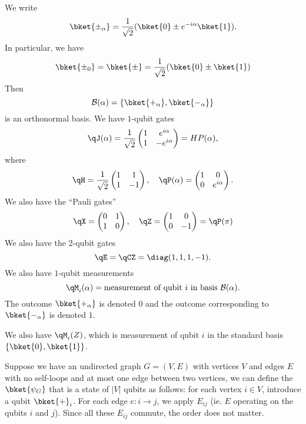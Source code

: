 \documentclass[a4paper]{article}
\begin{document}
\begin{notation}\index{$\bket{\pm_\alpha}$}
  We write
  \[
    \bket{\pm_\alpha} = \frac{1}{\sqrt{2}} (\bket{0} \pm e^{-i\alpha} \bket{1}).
  \]
  In particular, we have
  \[
    \bket{\pm_0} = \bket{\pm} = \frac{1}{\sqrt{2}}(\bket{0} \pm \bket{1})
  \]
  Then
  \[
    \mathcal{B}(\alpha) = \{\bket{+_\alpha}, \bket{-_\alpha}\}
  \]
  is an orthonormal basis. We have $1$-qubit gates
  \[
    \qJ(\alpha) = \frac{1}{\sqrt{2}}
    \begin{pmatrix}
      1 & e^{i\alpha}\\
      1 & -e^{i\alpha}
    \end{pmatrix} = H P(\alpha),
  \]
  where
  \[
    \qH = \frac{1}{\sqrt{2}}
    \begin{pmatrix}
      1 & 1\\
      1 & -1
    \end{pmatrix},\quad \qP(\alpha) =
    \begin{pmatrix}
      1 & 0\\
      0 & e^{i\alpha}
    \end{pmatrix}.
  \]
  We also have the ``Pauli gates''
  \[
    \qX=
    \begin{pmatrix}
      0 & 1\\
      1 & 0
    \end{pmatrix},\quad
    \qZ =
    \begin{pmatrix}
      1 & 0\\
      0 & -1
    \end{pmatrix} = \qP(\pi)
  \]
  We also have the 2-qubit gates
  \[
    \qE = \qCZ = \diag(1, 1, 1, -1).
  \]
  We also have $1$-qubit measurements
  \[
    \qM_i(\alpha) = \text{measurement of qubit $i$ in basis $\mathcal{B}(\alpha)$}.
  \]
  The outcome $\bket{+_\alpha}$ is denoted $0$ and the outcome corresponding to $\bket{-_\alpha}$ is denoted $1$.

  We also have $\qM_i(Z)$, which is measurement of qubit $i$ in the standard basis $\{\bket{0}, \bket{1}\}$.

  Suppose we have an undirected graph $G = (V, E)$ with vertices $V$ and edges $E$ with no self-loops and at most one edge between two vertices, we can define the  $\bket{\psi_G}$ that is a state of $|V|$ qubits as follows: for each vertex $i \in V$, introduce a qubit $\bket{+}_i$. For each edge $e: i \to j$, we apply $E_{ij}$ (ie. $E$ operating on the qubits $i$ and $j$). Since all these $E_{ij}$ commute, the order does not matter.


\end{notation}
\end{document}
